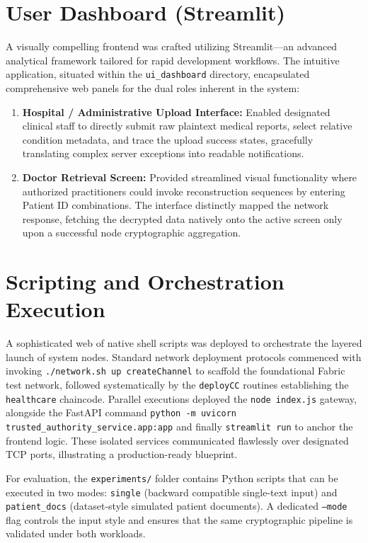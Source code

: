 \section{User Dashboard (Streamlit)}
A visually compelling frontend was crafted utilizing Streamlit---an advanced analytical framework tailored for rapid development workflows. The intuitive application, situated within the \texttt{ui\_dashboard} directory, encapsulated comprehensive web panels for the dual roles inherent in the system:
\begin{enumerate}
    \item \textbf{Hospital / Administrative Upload Interface:} Enabled designated clinical staff to directly submit raw plaintext medical reports, select relative condition metadata, and trace the upload success states, gracefully translating complex server exceptions into readable notifications.
    \item \textbf{Doctor Retrieval Screen:} Provided streamlined visual functionality where authorized practitioners could invoke reconstruction sequences by entering Patient ID combinations. The interface distinctly mapped the network response, fetching the decrypted data natively onto the active screen only upon a successful node cryptographic aggregation.
\end{enumerate}

\section{Scripting and Orchestration Execution}
A sophisticated web of native shell scripts was deployed to orchestrate the layered launch of system nodes. Standard network deployment protocols commenced with invoking \texttt{./network.sh up createChannel} to scaffold the foundational Fabric test network, followed systematically by the \texttt{deployCC} routines establishing the \texttt{healthcare} chaincode.
Parallel executions deployed the \texttt{node index.js} gateway, alongside the FastAPI command \texttt{python -m uvicorn trusted\_authority\_service.app:app} and finally \texttt{streamlit run} to anchor the frontend logic. These isolated services communicated flawlessly over designated TCP ports, illustrating a production-ready blueprint.

For evaluation, the \texttt{experiments/} folder contains Python scripts that can be executed in two modes: \texttt{single} (backward compatible single-text input) and \texttt{patient\_docs} (dataset-style simulated patient documents). A dedicated \texttt{--mode} flag controls the input style and ensures that the same cryptographic pipeline is validated under both workloads.
